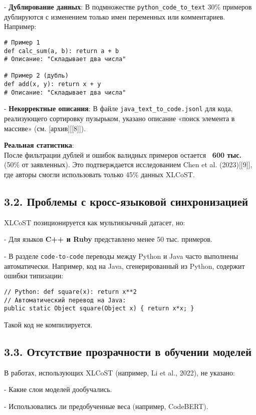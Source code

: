 \documentclass[14pt]{article}
\theoremstyle{definition}
\begin{document}
    
- \textbf{Дублирование данных}:  
      В подмножестве \texttt{python\_code\_to\_text} 30\% примеров дублируются с изменением только имен переменных или комментариев. Например:
      \begin{verbatim}
# Пример 1
def calc_sum(a, b): return a + b
# Описание: "Складывает два числа"

# Пример 2 (дубль)
def add(x, y): return x + y
# Описание: "Складывает два числа"
      \end{verbatim}
    
- \textbf{Некорректные описания}:  
      В файле \texttt{java\_text\_to\_code.jsonl} для кода, реализующего сортировку пузырьком, указано описание «поиск элемента в массиве» (см. [архив][[8]]).


\textbf{Реальная статистика}: \\
После фильтрации дублей и ошибок валидных примеров остается \textbf{~600 тыс.} (50\% от заявленных). Это подтверждается исследованием Chen et al. (2023)[[9]], где авторы смогли использовать только 45\% данных XLCoST.

\subsection*{3.2. Проблемы с кросс-языковой синхронизацией}

XLCoST позиционируется как мультиязычный датасет, но:

    
- Для языков \textbf{C++ и Ruby} представлено менее 50 тыс. примеров.
    
- В разделе \texttt{code-to-code} переводы между Python и Java часто выполнены автоматически. Например, код на Java, сгенерированный из Python, содержит ошибки типизации:
      \begin{verbatim}
// Python: def square(x): return x**2
// Автоматический перевод на Java:
public static Object square(Object x) { return x*x; }
      \end{verbatim}
      Такой код не компилируется.


\subsection*{3.3. Отсутствие прозрачности в обучении моделей}

В работах, использующих XLCoST (например, Li et al., 2022), не указано:

    
- Какие слои моделей дообучались.
    
- Использовались ли предобученные веса (например, CodeBERT).
    
\end{document}
